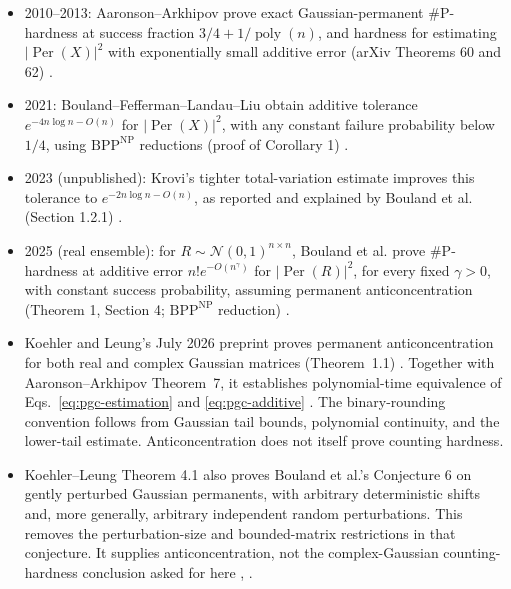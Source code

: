 \begin{itemize}
  \item 2010--2013: Aaronson--Arkhipov prove exact Gaussian-permanent
$\#\mathrm{P}$-hardness at success fraction
$3/4+1/\operatorname{poly}(n)$, and hardness for estimating
$|\operatorname{Per}(X)|^2$ with exponentially small additive error
(arXiv Theorems 60 and 62) .

  \item 2021: Bouland--Fefferman--Landau--Liu obtain additive tolerance
$e^{-4n\log n-O(n)}$ for $|\operatorname{Per}(X)|^2$, with any constant
failure probability below $1/4$, using $\mathrm{BPP}^{\mathrm{NP}}$ reductions
(proof of Corollary 1) .

  \item 2023 (unpublished): Krovi's tighter total-variation estimate improves
this tolerance to $e^{-2n\log n-O(n)}$, as reported and explained by
Bouland et al. (Section 1.2.1) .

  \item 2025 (real ensemble): for $R\sim\mathcal{N}(0,1)^{n\times n}$,
Bouland et al. prove $\#\mathrm{P}$-hardness at additive error
$n!e^{-O(n^\gamma)}$ for $|\operatorname{Per}(R)|^2$, for every fixed
$\gamma>0$, with constant success probability, assuming permanent
anticoncentration (Theorem 1, Section 4; $\mathrm{BPP}^{\mathrm{NP}}$ reduction)
.

  \item Koehler and Leung's July 2026 preprint proves permanent anticoncentration for both real and complex Gaussian matrices (Theorem~1.1) .
Together with Aaronson--Arkhipov Theorem~7, it establishes polynomial-time equivalence of Eqs.~\eqref{eq:pgc-estimation} and \eqref{eq:pgc-additive} .
The binary-rounding convention follows from Gaussian tail bounds, polynomial continuity, and the lower-tail estimate.
Anticoncentration does not itself prove counting hardness.

  \item Koehler--Leung Theorem 4.1 also proves Bouland et al.'s Conjecture 6 on gently perturbed Gaussian permanents, with arbitrary deterministic shifts and, more generally, arbitrary independent random perturbations. This removes the perturbation-size and bounded-matrix restrictions in that conjecture. It supplies anticoncentration, not the complex-Gaussian counting-hardness conclusion asked for here , .
\end{itemize}

